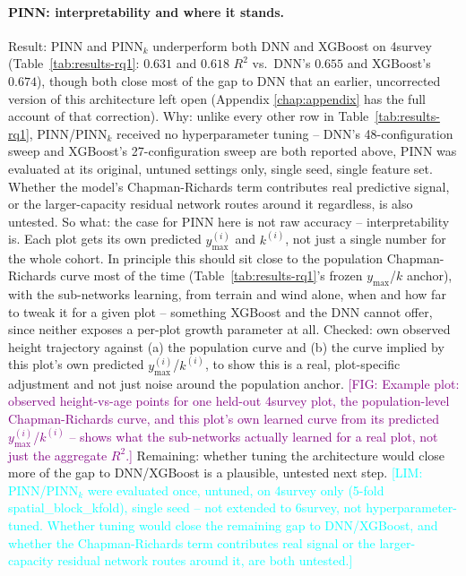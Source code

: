 \documentclass[logo,msc,ai]{infthesis}           %
\newcommand{\fig}[1]{\textcolor{purple}{[FIG: #1]}}
\newcommand{\limit}[1]{\textcolor{cyan}{[LIM: #1]}}
\begin{document}
\paragraph*{PINN: interpretability and where it stands.}
\label{sec:rq1-pinn-limitation}
Result: PINN and PINN$_k$ underperform both DNN and XGBoost on 4survey
(Table~\ref{tab:results-rq1}: $0.631$ and $0.618$ $R^2$ vs.\ DNN's $0.655$
and XGBoost's $0.674$), though both close most of the gap to DNN that an
earlier, uncorrected version of this architecture left open (Appendix
\ref{chap:appendix} has the full account of that correction).
Why: unlike every other row in Table~\ref{tab:results-rq1}, PINN/PINN$_k$
received no hyperparameter tuning -- DNN's 48-configuration sweep and
XGBoost's 27-configuration sweep are both reported above, PINN was evaluated
at its original, untuned settings only, single seed, single feature set.
Whether the model's Chapman-Richards term contributes real predictive
signal, or the larger-capacity residual network routes around it regardless,
is also untested.
So what: the case for PINN here is not raw accuracy -- interpretability is.
Each plot gets its own predicted $y_{\max}^{(i)}$ and $k^{(i)}$, not just a
single number for the whole cohort. In principle this should sit close to
the population Chapman-Richards curve most of the time (Table~\ref{tab:results-rq1}'s
frozen $y_{\max}$/$k$ anchor), with the sub-networks learning, from terrain
and wind alone, when and how far to tweak it for a given plot -- something
XGBoost and the DNN cannot offer, since neither exposes a per-plot growth
parameter at all.
Checked: %
own observed height trajectory against (a) the population curve and (b) the
curve implied by this plot's own predicted $y_{\max}^{(i)}$/$k^{(i)}$, to
show this is a real, plot-specific adjustment and not just noise around the
population anchor.
\fig{Example plot: observed height-vs-age points for one held-out 4survey
plot, the population-level Chapman-Richards curve, and this plot's own
learned curve from its predicted $y_{\max}^{(i)}$/$k^{(i)}$ -- shows what the
sub-networks actually learned for a real plot, not just the aggregate $R^2$.}
Remaining: whether tuning the architecture would close more of the gap to
DNN/XGBoost is a plausible, untested next step.
\limit{PINN/PINN$_k$ were evaluated once, untuned, on 4survey only (5-fold
spatial\_block\_kfold), single seed -- not extended to 6survey, not
hyperparameter-tuned. Whether tuning would close the remaining gap to
DNN/XGBoost, and whether the Chapman-Richards term contributes real signal
or the larger-capacity residual network routes around it, are both
untested.}
\end{document}
